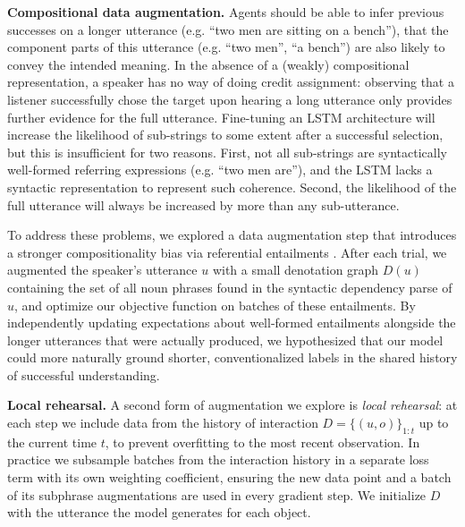 \documentclass[11pt,a4paper]{article}
\newcommand{\prg}[1]{\noindent\textbf{#1}} %
\begin{document}
\prg{Compositional data augmentation.} 
Agents should be able to infer previous successes on a longer utterance (e.g. ``two men are sitting on a bench''), that the component parts of this utterance (e.g. ``two men'', ``a bench'') are also likely to convey the intended meaning.
In the absence of a (weakly) compositional representation, a speaker has no way of doing credit assignment: observing that a listener successfully chose the target upon hearing a long utterance only provides further evidence for the full utterance.
Fine-tuning an LSTM architecture will increase the likelihood of sub-strings to some extent after a successful selection, but this is insufficient for two reasons.
First, not all sub-strings are syntactically well-formed referring expressions (e.g. ``two men are''), and the LSTM lacks a syntactic representation to represent such coherence.
Second, the likelihood of the full utterance will always be increased by more than any sub-utterance.

To address these problems, we explored a data augmentation step that introduces a stronger compositionality bias via referential entailments \cite{young2014image}.
After each trial, we augmented the speaker's utterance $u$ with a small denotation graph $D(u)$ containing the set of all noun phrases found in the syntactic dependency parse of $u$, and optimize our objective function on batches of these entailments.
By independently updating expectations about well-formed entailments alongside the longer utterances that were actually produced, we hypothesized that our model could more naturally ground shorter, conventionalized labels in the shared history of successful understanding. 


\prg{Local rehearsal.}
A second form of augmentation we explore is \emph{local rehearsal}: at each step we include data from the history of interaction $D = \{(u, o)\}_{1:t}$  up to the current time $t$, to prevent overfitting to the most recent observation.
In practice we subsample batches from the interaction history in a separate loss term with its own weighting coefficient, ensuring the new data point and a batch of its subphrase augmentations are used in every gradient step. We initialize $D$ with the utterance the model generates for each object.
\end{document}
